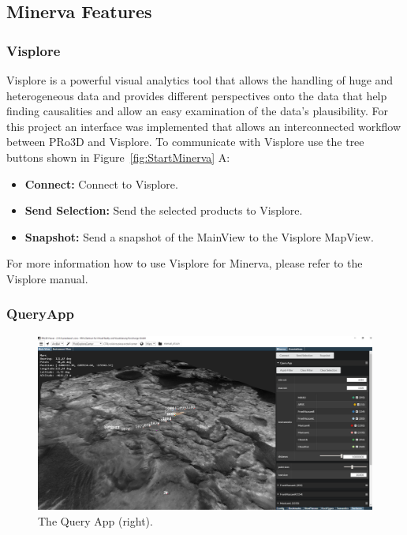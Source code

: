 \subsection{Minerva Features}
\label{sec:minervaFatures}

\subsubsection{Visplore}

Visplore is a powerful visual analytics tool that allows the handling of huge and heterogeneous data and provides different perspectives onto the data that help finding causalities and allow an easy examination of the data's plausibility. 
For this project an interface was implemented that allows an interconnected workflow between PRo3D and Visplore.
To communicate with Visplore use the tree buttons shown in Figure~\ref{fig:StartMinerva} A:
\begin{itemize}
	\item \textbf{Connect:} Connect to Visplore.
	\item \textbf{Send Selection:} Send the selected products to Visplore.
	\item \textbf{Snapshot:} Send a snapshot of the MainView to the Visplore MapView.
\end{itemize}
For more information how to use Visplore for Minerva, please refer to the Visplore manual.

\subsubsection{QueryApp}
	
	\begin{figure}[h]
    	\centering
    		\includegraphics[width=1\textwidth]{pics/QueryApp.png}
    	\caption[Query App]{The Query App (right).}
    	\label{fig:QueryApp}
   \end{figure}

